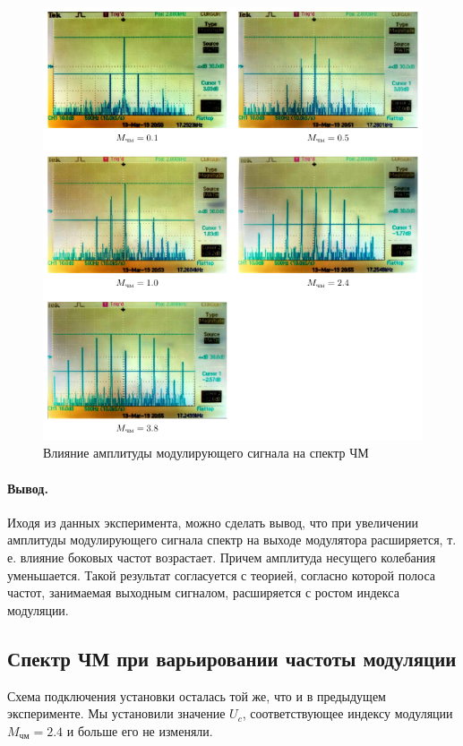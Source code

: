 \documentclass[a4paper,12pt]{article}
\begin{document}
\begin{figure}[H]
	\centering
	\includegraphics[width=\textwidth]{plot/M}
	\vspace{-2em}
	\caption{Влияние амплитуды модулирующего сигнала на спектр ЧМ}
	\label{fig:M}
\end{figure}
\paragraph{Вывод.} %
	Иходя из данных эксперимента, можно сделать вывод, что при увеличении амплитуды модулирующего сигнала спектр на выходе модулятора расширяется, т. е. влияние боковых частот возрастает. Причем амплитуда несущего колебания уменьшается. Такой результат согласуется с теорией, согласно которой полоса частот, занимаемая выходным сигналом, расширяется с ростом индекса модуляции.

\subsection{Спектр ЧМ при варьировании частоты модуляции}

Схема подключения установки осталась той же, что и в предыдущем эксперименте. Мы установили значение $U_c$, соответствующее индексу модуляции $M_\text{чм}=2.4$ и больше его не изменяли.
\end{document}
